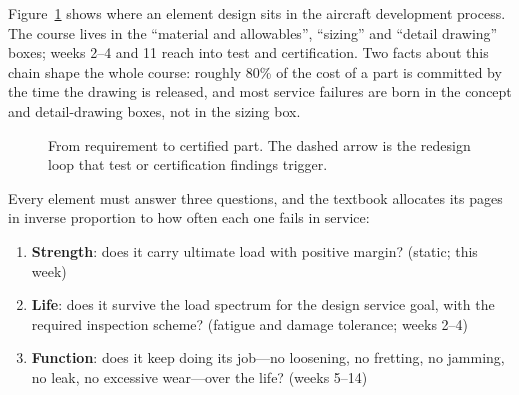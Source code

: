 \documentclass[11pt,a4paper]{article}
\begin{document}
Figure~\ref{fig:flow} shows where an element design sits in the aircraft development process. The course lives in the ``material and allowables'', ``sizing'' and ``detail drawing'' boxes; weeks 2--4 and 11 reach into test and certification. Two facts about this chain shape the whole course: roughly 80\% of the cost of a part is committed by the time the drawing is released, and most service failures are born in the concept and detail-drawing boxes, not in the sizing box.

\begin{figure}[H]\centering
{}
\caption{From requirement to certified part. The dashed arrow is the redesign loop that test or certification findings trigger.}\label{fig:flow}
\end{figure}


Every element must answer three questions, and the textbook allocates its pages in inverse proportion to how often each one fails in service:
\begin{enumerate}[nosep]
  \item \textbf{Strength}: does it carry ultimate load with positive margin? (static; this week)
  \item \textbf{Life}: does it survive the load spectrum for the design service goal, with the required inspection scheme? (fatigue and damage tolerance; weeks 2--4)
  \item \textbf{Function}: does it keep doing its job---no loosening, no fretting, no jamming, no leak, no excessive wear---over the life? (weeks 5--14)
\end{enumerate}
\end{document}
